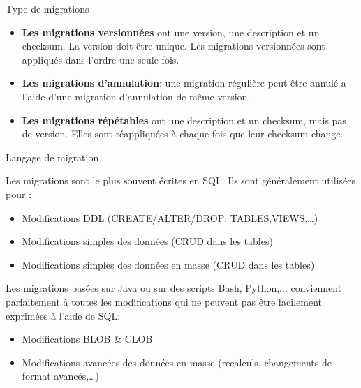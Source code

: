 \documentclass[slidestop,compress,11pt,xcolor=dvipsnames,french]{beamer}
\begin{document}
\begin{frame}{Type de migrations}

\begin{itemize}
 \item \textbf{Les migrations versionnées} ont une version, une description et un checksum. La version doit être unique. Les migrations versionnées sont appliqués dans l'ordre une seule fois. 
 \item \textbf{Les migrations d'annulation}: une migration régulière peut être annulé a l'aide d'une migration d'annulation de même version. 
 \item \textbf{Les migrations répétables} ont une description et un checksum, mais pas de version. Elles sont réappliquées à chaque fois que leur checksum change. 

\end{itemize}
\end{frame}

\begin{frame}{Langage de migration}

Les migrations sont le plus souvent écrites en SQL. Ils sont généralement utilisées pour :

\begin{itemize}
\item Modifications DDL (CREATE/ALTER/DROP: TABLES,VIEWS,…)
\item Modifications simples des données (CRUD dans les tables)
\item Modifications simples des données en masse (CRUD dans les tables)
\end{itemize}

\vspace{1cm}

Les migrations basées sur Java ou sur des scripts Bash, Python,... conviennent parfaitement à toutes les modifications qui ne peuvent pas être facilement exprimées à l'aide de SQL:
\begin{itemize}
 \item Modifications BLOB \& CLOB
 \item Modifications avancées des données en masse (recalculs, changements de format avancés,…)
\end{itemize}

\end{frame}
\end{document}
